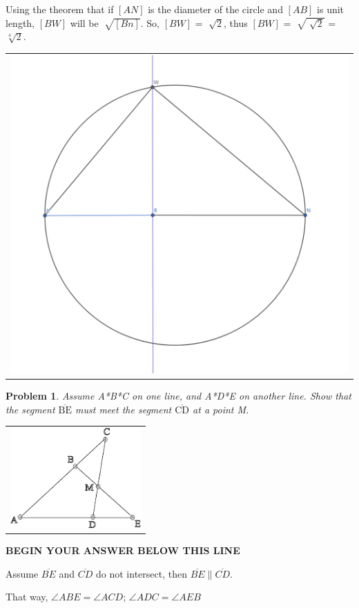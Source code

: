 \documentclass[letter,12pt]{article}
\newtheorem{problem}[main_theorem]{Problem}
\newcommand{\answerspacetop}{
	\begin{center}
		\textbf{BEGIN YOUR ANSWER BELOW THIS LINE} \\ \hrulefill
	\end{center}
}
\begin{document}
Using the theorem that if $[AN]$ is the diameter of the circle and $[AB]$ is unit length, $[BW]$ will be $\sqrt[]{[Bn]}$.
So, $[BW]$ = $\sqrt[]{2}$, thus $[BW]$ = $\sqrt[]{\sqrt[]{2}}$ = $\sqrt[4]{2}$.
\begin{center}
	\begin{tabular}{c}
		\includegraphics[width=0.7\columnwidth]{Q1B_7.png} \\
	\end{tabular}
\end{center}
\pagebreak

\begin{problem}
    Assume A*B*C on one line, and
A*D*E on another line. Show that the
segment $\overline{\text{BE}}$ must meet the segment $\overline{\text{CD}}$
at a point M. 
\end{problem}
\begin{center}
\begin{tabular}{c}
\includegraphics[width=50mm]{problem.eps} \\
\end{tabular}
\end{center}
\answerspacetop

Assume $\overline{BE}$ and $\overline{CD}$ do not intersect, then $\overline{BE} \parallel \overline{CD}$.

That way, $\angle ABE = \angle ACD$; $\angle ADC = \angle AEB$
\end{document}
